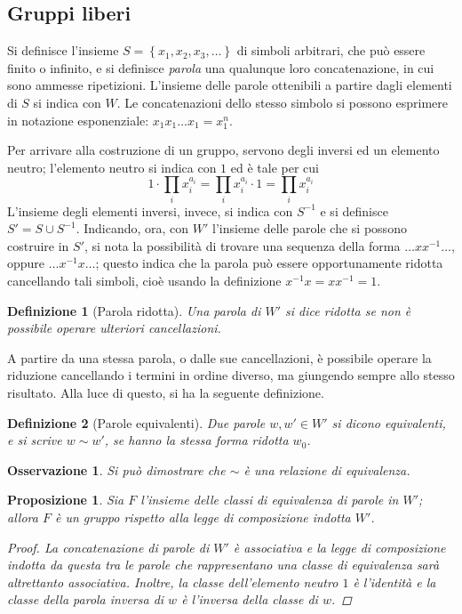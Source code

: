 \documentclass[11pt]{scrartcl}
\theoremstyle{style1}
\newtheorem{osservazione}{Osservazione}[section]
\newtheorem{prop}{Proposizione}[section]
\newtheorem{definizione}{Definizione}[section]
\numberwithin{equation}{subsection}
\begin{document}
\subsection{Gruppi liberi}
Si definisce l'insieme $S=\left\{ x_1,x_2,x_3,\ldots \right\} $ di simboli arbitrari, che pu\`o essere finito o infinito, e si definisce \textit{parola} una qualunque loro concatenazione, in cui sono ammesse ripetizioni. 
L'insieme delle parole ottenibili a partire dagli elementi di $S$ si indica con $W $.
Le concatenazioni dello stesso simbolo si possono esprimere in notazione esponenziale: $x_1 x_1 \ldots x_1 = x_1^n$.

Per arrivare alla costruzione di un gruppo, servono degli inversi ed un elemento neutro; l'elemento neutro si indica con $1$ ed \`e tale per cui
\[
1 \cdot \prod_{i} x_i^{a_i} = \prod_{i} x_i^{a_i} \cdot 1 = \prod_{i} x_i^{a_i} 
\] 
L'insieme degli elementi inversi, invece, si indica con $S^{-1}$ e si definisce $S' = S \cup S^{-1}$.
Indicando, ora, con $W'$ l'insieme delle parole che si possono costruire in $S'$, si nota la possibilit\`a di trovare una sequenza della forma $\ldots x x^{-1}\ldots$, oppure $\ldots x^{-1}x \ldots$; questo indica che la parola pu\`o essere opportunamente ridotta cancellando tali simboli, cio\`e usando la definizione $x^{-1} x = x x^{-1}= 1$.
\begin{definizione}
	[Parola ridotta]
	Una parola di $W'$ si dice \textit{ridotta} se non \`e possibile operare ulteriori cancellazioni.
\end{definizione}
\noindent A partire da una stessa parola, o dalle sue cancellazioni, \`e possibile operare la riduzione cancellando i termini in ordine diverso, ma giungendo sempre allo stesso risultato.
Alla luce di questo, si ha la seguente definizione.
\begin{definizione}
	[Parole equivalenti]
	Due parole $w, w' \in W'$ si dicono \textit{equivalenti}, e si scrive $w \sim w'$, se hanno la stessa forma ridotta $w_0$.
\end{definizione}
\begin{osservazione}
	Si pu\`o dimostrare che $\sim$ \`e una relazione di equivalenza.
\end{osservazione}
\begin{prop}
	Sia $F$ l'insieme delle classi di equivalenza di parole in $W'$; allora $F$ \`e un gruppo rispetto alla legge di composizione indotta $W'$.
	\begin{proof}
		La concatenazione di parole di $W'$ \`e associativa e la legge di composizione indotta da questa tra le parole che rappresentano una classe di equivalenza sar\`a altrettanto associativa.
		Inoltre, la classe dell'elemento neutro $1$ \`e l'identit\`a e la classe della parola inversa di $w$ \`e l'inversa della classe di $w$.
	\end{proof}
\end{prop}
\end{document}
